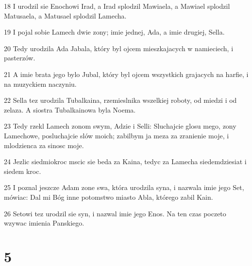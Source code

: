 \par 18 I urodzil sie Enochowi Irad, a Irad splodzil Mawiaela, a Mawiael splodzil Matusaela, a Matusael splodzil Lamecha.
\par 19 I pojal sobie Lamech dwie zony; imie jednej, Ada, a imie drugiej, Sella.
\par 20 Tedy urodzila Ada Jabala, który byl ojcem mieszkajacych w namieciech, i pasterzów.
\par 21 A imie brata jego bylo Jubal, który byl ojcem wszystkich grajacych na harfie, i na muzyckiem naczyniu.
\par 22 Sella tez urodzila Tubalkaina, rzemieslnika wszelkiej roboty, od miedzi i od zelaza. A siostra Tubalkainowa byla Noema.
\par 23 Tedy rzekl Lamech zonom swym, Adzie i Selli: Sluchajcie glosu mego, zony Lamechowe, posluchajcie slów moich; zabilbym ja meza za zranienie moje, i mlodzienca za sinosc moje.
\par 24 Jezlic siedmiokroc mscic sie beda za Kaina, tedyc za Lamecha siedemdziesiat i siedem kroc.
\par 25 I poznal jeszcze Adam zone swa, która urodzila syna, i nazwala imie jego Set, mówiac: Dal mi Bóg inne potomstwo miasto Abla, którego zabil Kain.
\par 26 Setowi tez urodzil sie syn, i nazwal imie jego Enos. Na ten czas poczeto wzywac imienia Panskiego.

\chapter{5}

